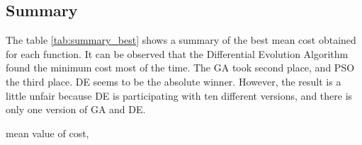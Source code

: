 \documentclass[12pt]{article}
\begin{document}
    \subsection{Summary}
    

The table \ref{tab:summary_best} shows a summary of the best mean cost obtained for each function. It can be observed that the Differential Evolution Algorithm found the minimum cost most of the time. The GA took second place,  and PSO the third place. DE seems to be the absolute winner. However, the result is a little unfair because DE is participating with ten different versions, and there is only one version of GA and DE.





mean value of cost, 
\end{document}
